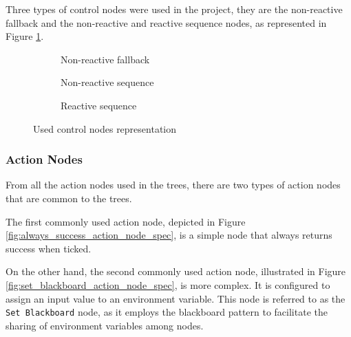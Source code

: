 Three types of control nodes were used in the project, they are the non-reactive fallback and the non-reactive and reactive sequence nodes, as represented in Figure \ref{fig:control_nodes_spec}.

\begin{figure}[!h]
    \centering
    \begin{subfigure}[b]{.32\linewidth}
        \centering
        \scalebox{.8} {
            \begin{forest}
            \end{forest}
        }
        \caption{Non-reactive fallback}
    \end{subfigure}
    \hfill
    \begin{subfigure}[b]{.32\linewidth}
        \centering
        \scalebox{.8} {
            \begin{forest}
            \end{forest}
        }
        \caption{Non-reactive sequence}
    \end{subfigure}
    \hfill
    \begin{subfigure}[b]{.32\linewidth}
        \centering
        \scalebox{.8} {
            \begin{forest}
            \end{forest}
        }
        \caption{Reactive sequence}
    \end{subfigure}
    \caption{Used control nodes representation}
    \label{fig:control_nodes_spec}
\end{figure}

\subsubsection{Action Nodes}
\label{subsubsec:common_action_nodes_spec}

From all the action nodes used in the trees, there are two types of action nodes that are common to the trees.

The first commonly used action node, depicted in Figure \ref{fig:always_success_action_node_spec}, is a simple node that always returns success when ticked. 

On the other hand, the second commonly used action node, illustrated in Figure \ref{fig:set_blackboard_action_node_spec}, is more complex. It is configured to assign an input value to an environment variable. This node is referred to as the \texttt{Set Blackboard} node, as it employs the blackboard pattern to facilitate the sharing of environment variables among nodes.

